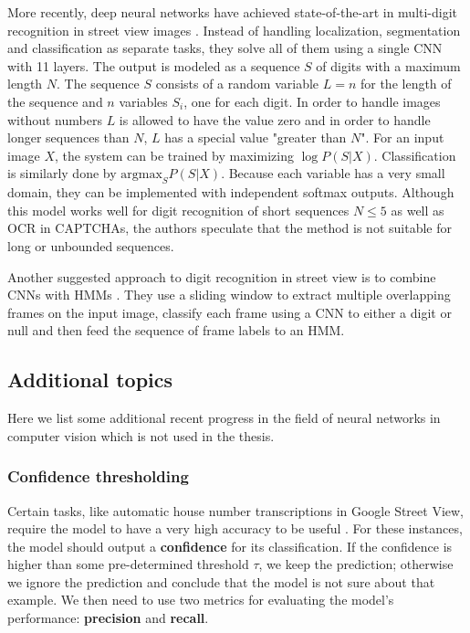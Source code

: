 More recently, deep neural networks have achieved state-of-the-art in multi-digit recognition in street view images \cite{multidigit_streetview}. Instead of handling localization, segmentation and classification as separate tasks, they solve all of them using a single CNN with 11 layers. The output is modeled as a sequence $S$ of digits with a maximum length $N$. The sequence $S$ consists of a random variable $L=n$ for the length of the sequence and $n$ variables $S_i$, one for each digit. In order to handle images without numbers $L$ is allowed to have the value zero and in order to handle longer sequences than $N$, $L$ has a special value "greater than $N$". For an input image $X$, the system can be trained by maximizing $\log P(S \vert X)$. Classification is similarly done by $\text{argmax}_S P(S \vert X)$.
Because each variable has a very small domain, they can be implemented with independent softmax outputs.
Although this model works well for digit recognition of short sequences $N \leq 5$ as well as OCR in CAPTCHAs, the authors speculate that the method is not suitable for long or unbounded sequences.

Another suggested approach to digit recognition in street view is to combine CNNs with HMMs \cite{multidigit_streetview_CNN_HMM}. They use a sliding window to extract multiple overlapping frames on the input image, classify each frame using a CNN to either a digit or null and then feed the sequence of frame labels to an HMM.



\subsection{Additional topics}

Here we list some additional recent progress in the field of neural networks in computer vision which is not used in the thesis.

\subsubsection{Confidence thresholding}

Certain tasks, like automatic house number transcriptions in Google Street View, require the model to have a very high accuracy to be useful \cite{multidigit_streetview}.
For these instances, the model should output a \textbf{confidence} for its classification. If the confidence is higher than some pre-determined threshold $\tau$, we keep the prediction; otherwise we ignore the prediction and conclude that the model is not sure about that example.
We then need to use two metrics for evaluating the model's performance: \textbf{precision} and \textbf{recall}.

